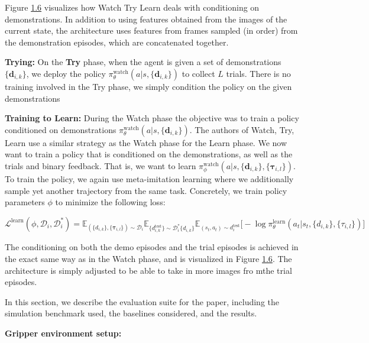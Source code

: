 \documentclass[
  letterpaper,
  DIV=11,
  numbers=noendperiod,
  oneside]{scrreprt}
\theoremstyle{remark}
\begin{document}
Figure \hyperref[fig:watch-try-learn-arch]{1.6} visualizes how Watch Try
Learn deals with conditioning on demonstrations. In addition to using
features obtained from the images of the current state, the architecture
uses features from frames sampled (in order) from the demonstration
episodes, which are concatenated together.

\textbf{Trying:} On the \textbf{Try} phase, when the agent is given a
set of demonstrations \(\{\textbf{d}_{i,k}\}\), we deploy the policy
\(\pi_\theta^{\text{watch}}(a | s, \{\textbf{d}_{i,k}\})\) to collect
\(L\) trials. There is no training involved in the Try phase, we simply
condition the policy on the given demonstrations

\textbf{Training to Learn:} During the Watch phase the objective was to
train a policy conditioned on demonstrations
\(\pi_\theta^{\text{watch}}(a | s, \{\textbf{d}_{i,k}\})\). The authors
of Watch, Try, Learn use a similar strategy as the Watch phase for the
Learn phase. We now want to train a policy that is conditioned on the
demonstrations, as well as the trials and binary feedback. That is, we
want to learn
\(\pi_\phi^{\text{watch}}(a | s, \{\textbf{d}_{i,k}\}, \{\mathbf{\tau}_{i, l}\})\).
To train the policy, we again use meta-imitation learning where we
additionally sample yet another trajectory from the same task.
Concretely, we train policy parameters \(\phi\) to minimize the
following loss:

\(\mathcal{L}^{\text{learn}}(\phi, \mathcal{D}_i, \mathcal{D}_i^*) = \mathbb{E}_{(\{d_{i,k}\}, \{\mathbf{\tau}_{i,l}\}) \sim \mathcal{D}_i} \mathbb{E}_{\{d_{i,k}^{\text{test}}\} \sim \mathcal{D}_i^* \{d_{i,k}\}} \mathbb{E}_{(s_t, a_t) \sim d_i^{\text{test}}} \big[
- \log \pi_\theta^{\text{learn}} (a_t | s_t, \{d_{i,k}\}, \{\tau_{i,l}\}) \big]\)

The conditioning on both the demo episodes and the trial episodes is
achieved in the exact same way as in the Watch phase, and is visualized
in Figure \hyperref[fig:watch-try-learn-arch]{1.6}. The architecture is
simply adjusted to be able to take in more images fro mthe trial
episodes.

In this section, we describe the evaluation suite for the paper,
including the simulation benchmark used, the baselines considered, and
the results.

\textbf{Gripper environment setup:}
\end{document}
